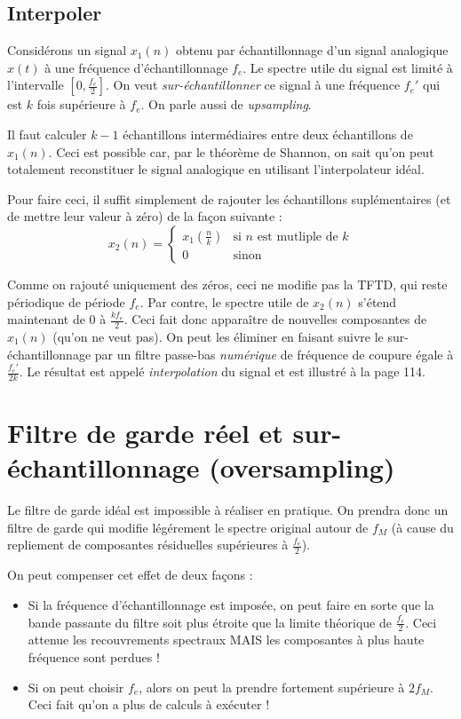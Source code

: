         \subsection{Interpoler}
            Considérons un signal $x_1(n)$ obtenu par échantillonnage d'un signal analogique $x(t)$ à une fréquence d'échantillonnage $f_e$. Le spectre utile du signal est limité à l'intervalle $[0, \frac{f_e}{2}]$. On veut \textit{sur-échantillonner} ce signal à une fréquence $f_e'$ qui est $k$ fois supérieure à $f_e$. On parle aussi de \textit{upsampling}.

            Il faut calculer $k - 1$ échantillons intermédiaires entre deux échantillons de $x_1(n)$. Ceci est possible car, par le théorème de Shannon, on sait qu'on peut totalement reconstituer le signal analogique en utilisant l'interpolateur idéal.

            Pour faire ceci, il suffit simplement de rajouter les échantillons suplémentaires (et de mettre leur valeur à zéro) de la façon suivante :
            $$
                x_2(n) = \begin{cases}
                    x_1(\frac{n}{k}) &\text{si } n \text{ est mutliple de } k\\
                    0 &\text{sinon}
                \end{cases}
            $$

            Comme on rajouté uniquement des zéros, ceci ne modifie pas la TFTD, qui reste périodique de période $f_e$. Par contre, le spectre utile de $x_2(n)$ s'étend maintenant de 0 à $\frac{kf_e}{2}$. Ceci fait donc apparaître de nouvelles composantes de $x_1(n)$ (qu'on ne veut pas). On peut les éliminer en faisant suivre le sur-échantillonnage par un filtre passe-bas \textit{numérique} de fréquence de coupure égale à $\frac{f_e'}{2k}$. Le résultat est appelé \textit{interpolation} du signal et est illustré à la page 114.

    \section{Filtre de garde réel et sur-échantillonnage (oversampling)}
        Le filtre de garde idéal est impossible à réaliser en pratique. On prendra donc un filtre de garde qui modifie légérement le spectre original autour de $f_M$ (à cause du repliement de composantes résiduelles supérieures à $\frac{f_e}{2}$).

        On peut compenser cet effet de deux façons :
        \begin{itemize}
            \item Si la fréquence d'échantillonnage est imposée, on peut faire en sorte que la bande passante du filtre soit plus étroite que la limite théorique de $\frac{f_e}{2}$. Ceci attenue les recouvrements spectraux MAIS les composantes à plus haute fréquence sont perdues !
            \item Si on peut choisir $f_e$, alors on peut la prendre fortement supérieure à $2f_M$. Ceci fait qu'on a plus de calculs à exécuter !
        \end{itemize}

